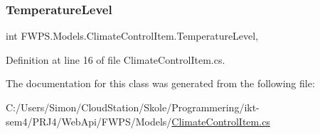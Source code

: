 \subsubsection{\texorpdfstring{Temperature\+Level}{TemperatureLevel}}
{\footnotesize\ttfamily int F\+W\+P\+S.\+Models.\+Climate\+Control\+Item.\+Temperature\+Level\hspace{0.3cm}{\ttfamily [get]}, {\ttfamily [set]}}



Definition at line 16 of file Climate\+Control\+Item.\+cs.



The documentation for this class was generated from the following file\+:\begin{DoxyCompactItemize}
\item 
C\+:/\+Users/\+Simon/\+Cloud\+Station/\+Skole/\+Programmering/ikt-\/sem4/\+P\+R\+J4/\+Web\+Api/\+F\+W\+P\+S/\+Models/\mbox{\hyperlink{_climate_control_item_8cs}{Climate\+Control\+Item.\+cs}}\end{DoxyCompactItemize}
